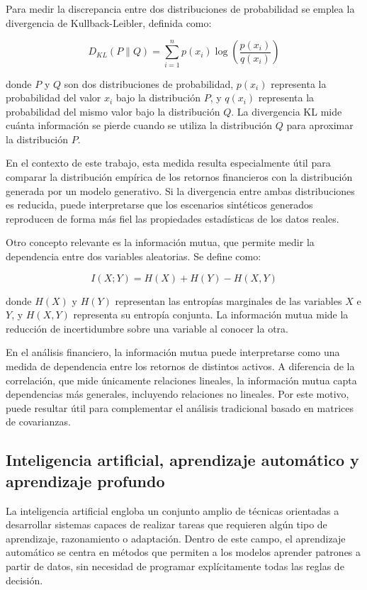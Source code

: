 Para medir la discrepancia entre dos distribuciones de probabilidad se emplea la divergencia de Kullback-Leibler, definida como:

\begin{equation}
D_{KL}(P \parallel Q)
=
\sum_{i=1}^{n} p(x_i)
\log\left(
\frac{p(x_i)}{q(x_i)}
\right)
\end{equation}

donde $P$ y $Q$ son dos distribuciones de probabilidad, $p(x_i)$ representa la probabilidad del valor $x_i$ bajo la distribución $P$, y $q(x_i)$ representa la probabilidad del mismo valor bajo la distribución $Q$. La divergencia KL mide cuánta información se pierde cuando se utiliza la distribución $Q$ para aproximar la distribución $P$.

En el contexto de este trabajo, esta medida resulta especialmente útil para comparar la distribución empírica de los retornos financieros con la distribución generada por un modelo generativo. Si la divergencia entre ambas distribuciones es reducida, puede interpretarse que los escenarios sintéticos generados reproducen de forma más fiel las propiedades estadísticas de los datos reales.

Otro concepto relevante es la información mutua, que permite medir la dependencia entre dos variables aleatorias. Se define como:

\begin{equation}
I(X;Y) = H(X) + H(Y) - H(X,Y)
\end{equation}

donde $H(X)$ y $H(Y)$ representan las entropías marginales de las variables $X$ e $Y$, y $H(X,Y)$ representa su entropía conjunta. La información mutua mide la reducción de incertidumbre sobre una variable al conocer la otra.

En el análisis financiero, la información mutua puede interpretarse como una medida de dependencia entre los retornos de distintos activos. A diferencia de la correlación, que mide únicamente relaciones lineales, la información mutua capta dependencias más generales, incluyendo relaciones no lineales. Por este motivo, puede resultar útil para complementar el análisis tradicional basado en matrices de covarianzas.

\subsection{Inteligencia artificial, aprendizaje automático y aprendizaje profundo}

La inteligencia artificial engloba un conjunto amplio de técnicas orientadas a desarrollar sistemas capaces de realizar tareas que requieren algún tipo de aprendizaje, razonamiento o adaptación. Dentro de este campo, el aprendizaje automático se centra en métodos que permiten a los modelos aprender patrones a partir de datos, sin necesidad de programar explícitamente todas las reglas de decisión.

